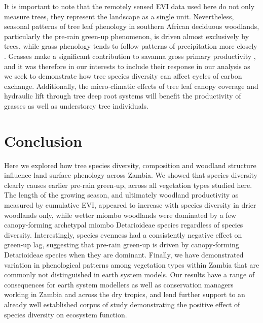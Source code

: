 \begin{refsection}
It is important to note that the remotely sensed EVI data used here do not only measure trees, they represent the landscape as a single unit. Nevertheless, seasonal patterns of tree leaf phenology in southern African deciduous woodlands, particularly the pre-rain green-up phenomenon, is driven almost exclusively by trees, while grass phenology tends to follow patterns of precipitation more closely \citep{Whitecross2017, Archibald2007, Higgins2011}. Grasses make a significant contribution to savanna gross primary productivity \citep{Lloyd2008}, and it was therefore in our interests to include their response in our analysis as we seek to demonstrate how tree species diversity can affect cycles of carbon exchange. Additionally, the micro-climatic effects of tree leaf canopy coverage and hydraulic lift through tree deep root systems will benefit the productivity of grasses as well as understorey tree individuals.

\section{Conclusion}
\label{phen:sec:conclusion}

Here we explored how tree species diversity, composition and woodland structure influence land surface phenology across Zambia. We showed that species diversity clearly causes earlier pre-rain green-up, across all vegetation types studied here. The length of the growing season, and ultimately woodland productivity as measured by cumulative EVI, appeared to increase with species diversity in drier woodlands only, while wetter miombo woodlands were dominated by a few canopy-forming archetypal miombo Detarioideae species regardless of species diversity. Interestingly, species evenness had a consistently negative effect on green-up lag, suggesting that pre-rain green-up is driven by canopy-forming Detarioideae species when they are dominant. Finally, we have demonstrated variation in phenological patterns among vegetation types within Zambia that are commonly not distinguished in earth system models. Our results have a range of consequences for earth system modellers as well as conservation managers working in Zambia and across the dry tropics, and lend further support to an already well established corpus of study demonstrating the positive effect of species diversity on ecosystem function.

\newpage{}
\FloatBarrier{}
\begingroup
{}
\printbibliography[heading=subbibintoc]
\endgroup
\newpage{}


\end{refsection}
